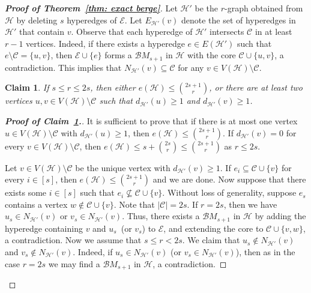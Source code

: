 \documentclass[11pt]{article}
\numberwithin{equation}{section}
\newtheorem{cla}{Claim}
\newcounter{cases}
\newcommand\cB{{\mathcal B}}
\newcommand\cC{{\mathcal C}}
\newcommand\cE{{\mathcal E}}
\newcommand\cH{{\mathcal H}}
\begin{document}
\begin{proof}[\bf Proof of Theorem~\ref{thm: exact berge}]
    Let $\cH'$ be the $r$-graph obtained from $\cH$ by deleting $s$ hyperedges of $\cE$. %
    Let $E_{\cH'}(v)$ denote the set of hyperedges in $\cH'$ that contain $v$.
    Observe that each hyperedge of $\cH'$ intersects $\cC$ in at least $r-1$ vertices. Indeed, if there exists a hyperedge $e\in E(\cH')$ such that $e\setminus \cC=\{u,v\}$, then $\cE\cup \{e\}$ forms a $\cB M_{s+1}$ in $\cH$ with the core $\cC\cup\{u,v\}$, a contradiction.
    This implies that $N_{\cH'}(v) \subseteq \cC$ for any $v\in V(\cH)\setminus \cC$.

    \begin{cla}\label{claim: 2 isolated vtx}
        If $s\leq r\leq 2s$,
        then either $e(\cH)\leq \binom{2s+1}{r}$,
        or there are at least two vertices $u, v\in V(\cH)\setminus \cC$ such that $d_{\cH'}(u) \geq 1$ and $d_{\cH'}(v) \geq 1$.
    \end{cla}

    \begin{proof}[{\bf{Proof of Claim~\ref{claim: 2 isolated vtx}.}}]
    It is sufficient to prove that if there is at most one vertex $u\in V(\cH)\setminus \cC$ with $d_{\cH'}(u) \geq 1$, then $e(\cH)\leq \binom{2s+1}{r}$.
    If $d_{\cH'}(v)=0$ for every $v\in V(\cH)\setminus \cC$, then $e(\cH) \leq s+\binom{2s}{r}\leq \binom{2s+1}{r}$ as $r\leq 2s$.

    Let $v\in V(\cH)\setminus \cC$ be the unique vertex with $d_{\cH'}(v)\geq 1$. If $e_i \subseteq \cC \cup \{v\}$ for every $i\in [s]$, then $e(\cH) \leq \binom{2s+1}{r}$ and we are done. Now suppose that there exists some $i\in [s]$ such that $e_i \nsubseteq \cC \cup \{v\}$.
    Without loss of generality, suppose $e_s$ contains a vertex $w \notin \cC \cup \{v\}$. Note that $|\cC|=2s$. If $r=2s$, then we have $u_s\in N_{\cH'}(v)$ or $v_s\in N_{\cH'}(v)$. Thus, there exists a $\cB M_{s+1}$ in $\cH$ by adding the hyperedge containing $v$ and $u_s$~(or $v_s$) to $\cE$, and extending the core to $\cC\cup \{v,w\}$, a contradiction. Now we assume that $s\leq r<2s$.
    We claim that $u_s\notin N_{\cH'}(v)$ and $v_s \notin N_{\cH'}(v)$.
    Indeed, if $u_s\in N_{\cH'}(v)$ (or $v_s\in N_{\cH'}(v)$), then as in the case $r=2s$ we may find a $\cB M_{s+1}$ in $\cH$, a contradiction.


\end{proof}
\end{proof}
\end{document}

